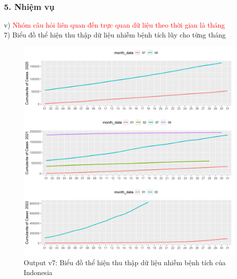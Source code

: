 \documentclass[english,10pt,table]{beamer}
\begin{document}
\begin{frame}[fragile]
\frametitle{5.  Nhiệm vụ}
v) \textcolor{red}{Nhóm câu hỏi liên quan đến trực quan dữ liệu theo thời gian là tháng}\\
    7) Biểu đồ thể hiện thu thập dữ liệu nhiễm bệnh tích lũy cho từng tháng
	\begin{figure}[h!]
	\begin{center}
		    \includegraphics[scale = 0.26]{Images/V/v7 Indonesia .jpeg}
		     \caption{Output v7: Biểu đồ thể hiện thu thập dữ liệu nhiễm bệnh tích của Indonesia}
		\end{center}
		\end{figure}
\end{frame}
\end{document}
